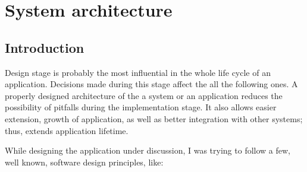 %


\chapter{System architecture}
\label{cha:sys_arch}


\section{Introduction}
\label{sec:gui}

Design stage is probably the most influential in the whole life cycle of an application. Decisions made during this stage affect the all the following ones. A properly designed architecture of the a system or an application reduces the possibility of pitfalls during the implementation stage. It also allows easier extension, growth of application, as well as better integration with other systems; thus, extends application lifetime.

While designing the application under discussion, I was trying to follow a few, well known, software design principles, like:

